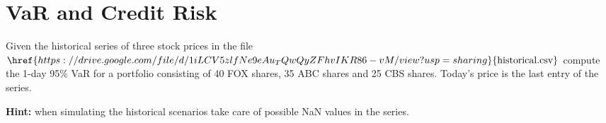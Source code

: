 \chapter{VaR and Credit Risk}\label{exercise-13}

\begin{Exercise}[title={(VaR and Historical Series)}]
Given the historical series of three stock prices in the file
\(\href{https://drive.google.com/file/d/1iLCV5zlfNe9eAu_TQwQyZFhvIKR86-vM/view?usp=sharing}{\textrm{historical.csv}}\)
compute the 1-day 95\% VaR for a portfolio consisting of 40 FOX shares, 35 ABC shares 
and 25 CBS shares. 
Today's price is the last entry of the series.

\textbf{Hint:} when simulating the historical scenarios take care of possible NaN values
in the series. 
\end{Exercise}

